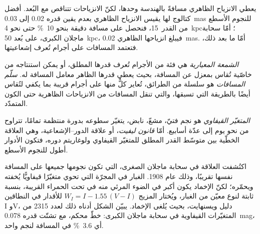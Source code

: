 يعطي الانزياح الظاهري مسافةً بالهندسة وحدها، لكنّ الانزياحات تتناقص مع
البُعد. أفضل كتالوج لها يقيس الانزياح الظاهري بعدم يقين
قدره 0.02 إلى \qty{0.03}{mas} للنجوم الأسطع من
القدر~15، فنحصل على مسافة دقيقة بنحو \qty{10}{\percent} حتى نحو
\qty{4}{kpc}؛ أمّا سحابة ماجلان الكبرى، على بُعد \qty{50}{kpc}، فيبلغ انزياحها الظاهري
\qty{0.02}{mas}. أمّا ما بعد ذلك، فتعتمد المسافات على أجرام تُعرف
إشعاعيتها.

\begin{definition}\label{def:b3:milky-way-galaxies:ladder}
\emph{الشمعة المعيارية} هي فئة من الأجرام
تُعرف قدرها المطلق، أو يمكن استنتاجه من خاصّية تُقاس
بمعزل عن المسافة، بحيث يعطي قدرها الظاهر
معامل المسافة له. \emph{سلّم المسافات} هو
سلسلة من الطرائق، تُعاير كلٌّ منها على أجرام قريبة بما يكفي لتُقاس
أيضًا بالطريقة التي تسبقها، والتي تنقل المسافات من
الانزياحات الظاهرية حتى الكون المتمدّد.
\end{definition}

\begin{definition}\label{def:b3:milky-way-galaxies:cepheid}
\emph{المتغيّر القيفاوي} هو نجم فتيّ، مشعّ،
نابض، يتغيّر سطوعه بدورة منتظمة تمامًا،
تتراوح من نحو يوم إلى عدّة أسابيع. أمّا \emph{قانون ليفيت}،
أو علاقة الدور--الإشعاعية، وهي العلاقة الخطّية بين متوسّط
القدر المطلق للمتغيّر القيفاوي ولوغاريتم دوره، فتكون الأدوار أطول
للنجوم الأسطع.
\end{definition}

اكتُشفت العلاقة في سحابة ماجلان الصغرى، التي تكون نجومها
جميعها على المسافة نفسها تقريبًا، وذلك عام 1908. الغبار في المجرّة التي
تحوي متغيّرًا قيفاويًّا يُخفته ويحمّره؛ لكنّ الإخماد يكون أكبر في
الضوء المرئي منه في تحت الحمراء القريبة، بنسبة ثابتة لنوع معيّن من
الغبار، ويُختار المزيج $W_I = I - 1.55\,(V - I)$ للأقدار في
النطاقين I وV، دليل ويسنهايت، بحيث
يُلغى الإخماد. يبيّن الشكل أدناه ذلك لعدد 2315 من المتغيّرات القيفاوية في
سحابة ماجلان الكبرى:  خطّ محكم، مع تشتّت قدره
\qty{0.078}{mag}، أي \qty{3.6}{\percent} في المسافة لنجم
واحد.

